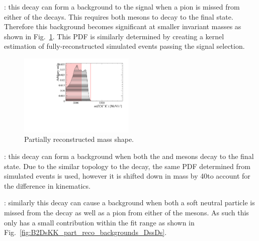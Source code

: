 \begin{description}
\item \decay{\Bsb}{\Dsp\Dsm}: this decay can form a background to the signal when a pion is missed from either of the \Dsp decays. This requires both \Dsp mesons to decay to the \decay{\Dsp}{\Kp\Km\pip} final state. 
Therefore this background becomes significant at smaller invariant masses as shown in Fig.~\ref{fig:B2DsKK_part_reco_backgrounds_DsDs}. 
This PDF is similarly determined by creating a kernel estimation of fully-reconstructed simulated events passing the signal selection.  
\end{description}

\begin{figure}[!h]
    \centering
    \includegraphics[width=0.49\textwidth]{figs/B2DsKK/Bs2DsDs_4800_5900_Shape.pdf}
    \caption{Partially reconstructed \decay{\Bsb}{\Dsp\Dsm} mass shape.}
    \label{fig:B2DsKK_part_reco_backgrounds_DsDs}   
\end{figure}

\begin{description}
\item \decay{\Bzb}{\Dsp\Dm}: this decay can form a background when both the \Dsp and \Dm mesons decay to the \Kpm\Kmp\pipm final state. Due to the similar topology to the \decay{\Bsb}{\Dsp\Dsm} decay, the same PDF determined from simulated events is used, however it is shifted down in mass by 40\mevcc to account for the difference in kinematics.

\item \decay{\Bsb}{\Dssp\Dsm}: similarly this decay can cause a background when both a soft neutral particle is missed from the  decay as well as a pion from either of the \Dsp mesons. As such this only has a small contribution within the fit range as shown in Fig.~\ref{fig:B2DsKK_part_reco_backgrounds_DssDs}. 
\end{description}

